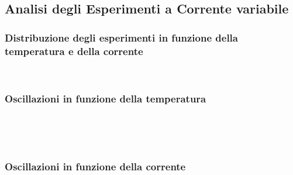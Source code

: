 \documentclass[11pt]{article}
\begin{document}
    \hypertarget{analisi-degli-esperimenti-a-corrente-variabile}{%
\subsection{Analisi degli Esperimenti a Corrente
variabile}\label{analisi-degli-esperimenti-a-corrente-variabile}}


    \hypertarget{distribuzione-degli-esperimenti-in-funzione-della-temperatura-e-della-corrente}{%
\subsubsection{Distribuzione degli esperimenti in funzione della
temperatura e della
corrente}\label{distribuzione-degli-esperimenti-in-funzione-della-temperatura-e-della-corrente}}


    \begin{center}
    \end{center}
    { \hspace*{\fill} \\}
    
    \hypertarget{oscillazioni-in-funzione-della-temperatura}{%
\subsubsection{Oscillazioni in funzione della
temperatura}\label{oscillazioni-in-funzione-della-temperatura}}



    \begin{center}
    \end{center}
    { \hspace*{\fill} \\}
    
    \begin{center}
    \end{center}
    { \hspace*{\fill} \\}
    
    \hypertarget{oscillazioni-in-funzione-della-corrente}{%
\subsubsection{Oscillazioni in funzione della
corrente}\label{oscillazioni-in-funzione-della-corrente}}
\end{document}
